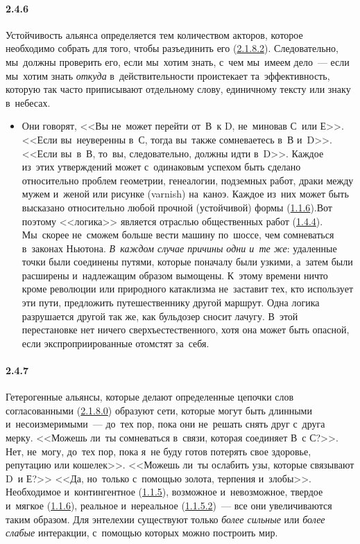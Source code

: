 \paragraph{2.4.6}\hypertarget{par:2.4.6}{} Устойчивость альянса определяется тем количеством акторов, которое необходимо собрать для того, чтобы разъединить его (\hyperlink{par:2.1.8.2}{2.1.8.2}). Следовательно, мы~должны проверить его, если мы~хотим знать, с~чем мы~имеем дело~--- если мы~хотим знать {\itshape откуда} в~действительности проистекает та~эффективность, которую так часто приписывают отдельному слову, единичному тексту или знаку в~небесах.
	\begin{itemize}
	\item 
	Они говорят, <<Вы не~может перейти от~В~к D, не~миновав С~или Е>>. <<Если вы~неуверенны в~С, тогда вы~также сомневаетесь в~В и~D>>. <<Если вы~в~В, то~вы, следовательно, должны идти в~D>>. Каждое из~этих утверждений может с~одинаковым успехом быть сделано относительно проблем геометрии, генеалогии, подземных работ, драки между мужем и~женой или рисунке (varnish) на~каноэ. Каждое из~них может быть высказано относительно любой прочной (устойчивой) формы (\hyperlink{par:1.1.6}{1.1.6}).Вот поэтому <<логика>> является отраслью общественных работ (\hyperlink{par:1.4.4}{1.4.4}). Мы~скорее не~сможем больше вести машину по~шоссе, чем сомневаться в~законах Ньютона. {\itshape В~каждом случае причины одни и~те же}: удаленные точки были соединены путями, которые поначалу были узкими, а~затем были расширены и~надлежащим образом вымощены. К~этому времени ничто кроме революции или природного катаклизма не~заставит тех, кто использует эти пути, предложить путешественнику другой маршрут. Одна логика разрушается другой так же, как бульдозер сносит лачугу. В~этой перестановке нет ничего сверхъестественного, хотя она может быть опасной, если экспроприированные отомстят за~себя.
	\end{itemize}

\paragraph{2.4.7}\hypertarget{par:2.4.7}{} Гетерогенные альянсы, которые делают определенные цепочки слов согласованными (\hyperlink{par:2.1.8.0}{2.1.8.0}) образуют сети, которые могут быть длинными и~несоизмеримыми~--- до~тех пор, пока они не~решать снять друг с~друга мерку. <<Можешь ли~ты сомневаться в~связи, которая соединяет В~с С?>>. Нет, не~могу, до~тех пор, пока я~не буду готов потерять свое здоровье, репутацию или кошелек>>. <<Можешь ли~ты ослабить узы, которые связывают D~и Е?>> <<Да, но~только с~помощью золота, терпения и~злобы>>. Необходимое и~контингентное (\hyperlink{par:1.1.5}{1.1.5}), возможное и~невозможное, твердое и~мягкое (\hyperlink{par:1.1.6}{1.1.6}), реальное и~нереальное (\hyperlink{par:1.1.5.2}{1.1.5.2})~--- все они увеличиваются таким образом. Для энтелехии существуют только {\itshape более сильные} или {\itshape более слабые} интеракции, с~помощью которых можно построить мир.

